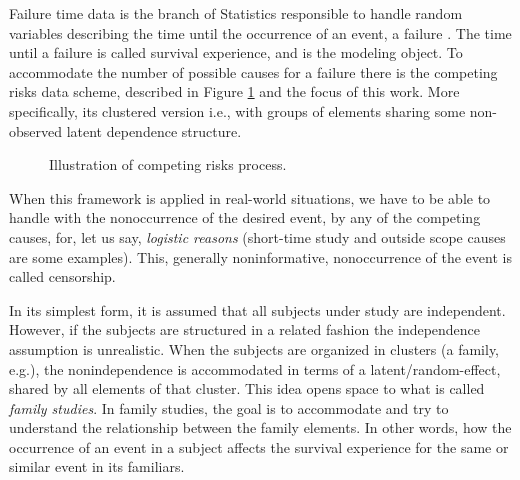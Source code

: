 \documentclass[a4paper,12pt]{article}
\begin{document}
Failure time data is the branch of Statistics responsible to handle
random variables describing the time until the occurrence of an event, a
failure \citep{kalb&prentice,hougaard00}. The time until a failure is
called survival experience, and is the modeling object. To accommodate
the number of possible causes for a failure there is the competing risks
data scheme, described in Figure \ref{fig:crp} and the focus of this
work. More specifically, its clustered version i.e., with groups of
elements sharing some non-observed latent dependence structure.

\begin{figure}[H]
 \centering
 \caption{Illustration of competing risks process.}
 \label{fig:crp}
\end{figure}

When this framework is applied in real-world situations, we have to be
able to handle with the nonoccurrence of the desired event, by any of
the competing causes, for, let us say, \textit{logistic reasons}
(short-time study and outside scope causes are some examples). This,
generally noninformative, nonoccurrence of the event is called
censorship.

In its simplest form, it is assumed that all subjects under study are
independent. However, if the subjects are structured in a related
fashion the independence assumption is unrealistic. When the subjects
are organized in clusters (a family, e.g.), the nonindependence is
accommodated in terms of a latent/random-effect, shared by all elements
of that cluster. This idea opens space to what is called \textit{family
  studies}. In family studies, the goal is to accommodate and try to
understand the relationship between the family elements. In other words,
how the occurrence of an event in a subject affects the survival
experience for the same or similar event in its familiars.
\end{document}
